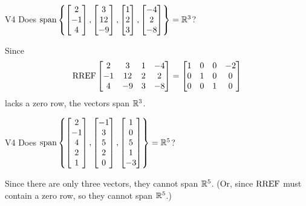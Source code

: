 \begin{problem}{V4}
Does
\(
  \operatorname{span}\left\{
    \begin{bmatrix} 2 \\ -1 \\ 4 \end{bmatrix},
    \begin{bmatrix} 3 \\ 12 \\ -9 \end{bmatrix},
    \begin{bmatrix} 1 \\ 2 \\ 3 \end{bmatrix},
    \begin{bmatrix} -4 \\ 2 \\ -8 \end{bmatrix}
  \right\} = \mathbb{R}^3
\)?
\end{problem}
\begin{solution}
Since
\[
  \operatorname{RREF}\begin{bmatrix}
    2 & 3 & 1 & -4 \\
    -1 & 12 & 2 & 2 \\
    4 & -9 & 3 & -8
  \end{bmatrix} =
  \begin{bmatrix}
    1 & 0 & 0 & -2 \\
    0 & 1 & 0 & 0 \\
    0 & 0 & 1 & 0
  \end{bmatrix}
\]
lacks a zero row, the vectors span \(\mathbb{R}^3\).
\end{solution}

\begin{problem}{V4}
Does
\(
  \operatorname{span}\left\{
    \begin{bmatrix} 2 \\ -1 \\ 4 \\ 2 \\ 1 \end{bmatrix},
    \begin{bmatrix} -1 \\ 3 \\ 5 \\ 2 \\ 0 \end{bmatrix},
    \begin{bmatrix} 1 \\ 0 \\ 5 \\ 1 \\ -3 \end{bmatrix}
  \right\} = \mathbb{R}^5
\)?
\end{problem}
\begin{solution}
Since there are only three vectors, they cannot span \(\mathbb{R}^5\).
(Or, since \(\operatorname{RREF}\) must contain a zero row, so they cannot span \(\mathbb{R}^5\).)
\end{solution}
